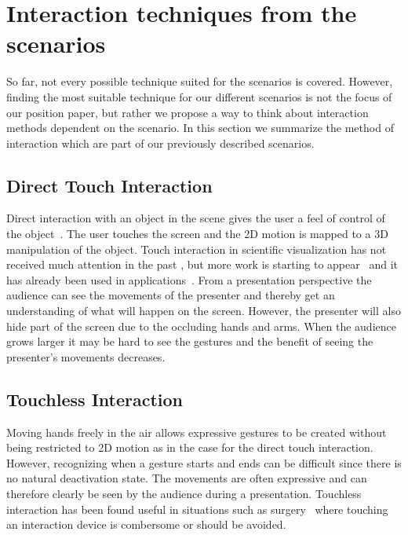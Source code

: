 \documentclass[review,journal]{vgtc}         %
\begin{document}
\section{Interaction techniques from the scenarios}

So far, not every possible technique suited for the scenarios is covered. However, finding the most suitable technique for our different scenarios is not the focus of our position paper, but rather we propose a way to think about interaction methods dependent on the scenario. In this section we summarize the method of interaction which are part of our previously described scenarios.

\subsection{Direct Touch Interaction}
Direct interaction with an object in the scene gives the user a feel of control of the object~\cite{isenberg2009studying}. 
The user touches the screen and the 2D motion is mapped to a 3D manipulation of the object. 
Touch interaction in scientific visualization has not received much attention in the past \cite{isenberg:hal-00781512}, 
but more work is starting to appear~\cite{Klein:2012:DSD:2322389.2322403} and it has already been used in applications~\cite{LRFPY11}.
From a presentation perspective the audience can see the movements of the presenter and thereby get an understanding of what will happen on the screen.
However, the presenter will also hide part of the screen due to the occluding hands and arms. 
When the audience grows larger it may be hard to see the gestures and the benefit of seeing the presenter's movements decreases.


\subsection{Touchless Interaction}
Moving hands freely in the air allows expressive gestures to be created without being restricted to 2D motion as in the case for the direct touch interaction. 
However, recognizing when a gesture starts and ends can be difficult since there is no natural deactivation state. 
The movements are often expressive and can therefore clearly be seen by the audience during a presentation. 
Touchless interaction has been found useful in situations such as surgery~\cite{Mentis:2012:IPI:2207676.2208536} where touching an interaction device is combersome or should be avoided.
\end{document}
